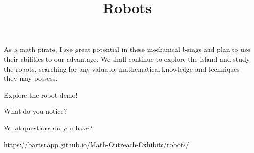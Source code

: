 \documentclass{../exhibit}
\title{Robots}
\begin{document}
\begin{context}
As a math pirate, I see great potential in these mechanical beings and
plan to use their abilities to our advantage. We shall continue to
explore the island and study the robots, searching for any valuable
mathematical knowledge and techniques they may possess.
\end{context}

\begin{directions}
  Explore the robot demo!

  What do you notice?

  What questions do you have?
\end{directions}

\begin{example}
\end{example}

\begin{mathConnections}
  https://bartsnapp.github.io/Math-Outreach-Exhibits/robots/
\end{mathConnections}
\end{document}

